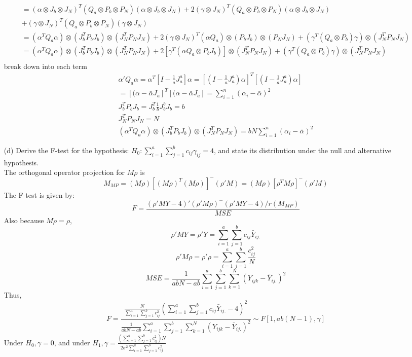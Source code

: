 \documentclass{homework}
\begin{document}
\begin{itemize}
\[\begin{split}
     = (\alpha \otimes J_b \otimes J_N)^T (Q_a \otimes P_b \otimes P_N) (\alpha \otimes J_b \otimes J_N) + 2(\gamma \otimes J_N)^T (Q_a \otimes P_b \otimes P_N) (\alpha \otimes J_b \otimes J_N) \\ +  (\gamma \otimes J_N)^T(Q_a \otimes P_b \otimes P_N)(\gamma \otimes J_N)\\
     = (\alpha^T Q_a \alpha) \otimes (J_b^T P_b J_b) \otimes (J_N^T P_N J_N) + 2(\gamma \otimes J_N)^T (\alpha Q_a) \otimes (P_bJ_b) \otimes (P_NJ_N) + (\gamma^T (Q_a \otimes P_b) \gamma) \otimes (J_N^T P_N J_N)\\
     = (\alpha^T Q_a \alpha) \otimes (J_b^T P_b J_b) \otimes (J_N^T P_N J_N) + 2[\gamma^T (\alpha Q_a \otimes P_bJ_b)] \otimes (J_N^T P_NJ_N) + (\gamma^T (Q_a \otimes P_b) \gamma) \otimes (J_N^T P_N J_N)\\ 
    \end{split}
    \]
    break down into each term
    \[ 
    \begin{split}
     \alpha'Q_a\alpha = \alpha^T [I- \frac{1}{a}J_a^a] \alpha  = [(I-\frac{1}{a}J_a^a)\alpha]^T[(I-\frac{1}{a}J_a^a)\alpha] \\
     = [(\alpha -\bar \alpha J_a]^T[(\alpha -\bar \alpha J_a] = \sum_{i=1}^{n} (\alpha_i - \bar \alpha)^2\\
     J_b^T P_b J_b = J_b^T \frac{1}{b} J_b^b J_b = b\\
     J_N^T P_N J_N = N\\
     (\alpha^T Q_a \alpha) \otimes (J_b^T P_b J_b) \otimes (J_N^T P_N J_N) =bN \sum_{i=1}^{n} (\alpha_i - \bar \alpha)^2
    \end{split}
    \] 
    
    \item[(d)] Derive the F-test for the hypothesis: $H_0: \sum_{i=1}^{a}\sum_{j=1}^{b} c_{ij}\gamma_{ij} =4$, and state its distribution under the null and alternative hypothesis.\\
    The orthogonal operator projection for $M\rho$ is\\
    \[ 
    M_{MP} = (M\rho) [(M\rho)^T (M\rho)]^{-} (\rho'M) = (M\rho) [\rho^T M\rho]^{-} (\rho'M)
    \]
     The F-test is given by:\\
    \[ 
    F = \frac{(\rho'MY - 4)' (\rho'M\rho)^{-} (\rho'MY -4)/ r(M_{MP})}{MSE}
    \] 
    Also because $M\rho = \rho$,
    \[ 
    \rho'MY = \rho'Y = \sum_{i=1}^{a}\sum_{j=1}^{b} c_{ij}\bar{Y}_{ij.}
    \] 
    \[ 
    \rho'M\rho = \rho'\rho =  \sum_{i=1}^{a}\sum_{j=1}^{b} \frac{c_{ij}^2}{N}
    \]
    \[ 
    MSE = \frac{1}{abN - ab} \sum_{i=1}^{a}\sum_{j=1}^{b}\sum_{k=1}^N (Y_{ijk} - \bar{Y}_{ij.})^2
    \]
    Thus,
    \[ 
    F =\frac{\frac{N}{\sum_{i=1}^{a}\sum_{j=1}^{b} c_{ij}^2} (\sum_{i=1}^{a}\sum_{j=1}^{b} c_{ij}\bar{Y}_{ij.} - 4)^2} {\frac{1}{abN - ab} \sum_{i=1}^{a}\sum_{j=1}^{b}\sum_{k=1}^N (Y_{ijk} - \bar{Y}_{ij.})^2} \sim F[1, ab(N-1), \gamma]
    \] 
    Under $H_0, \gamma = 0$, and under $H_1, \gamma = \frac{(\sum_{i=1}^{a}\sum_{j=1}^{b}c_{ij}^2)N}{2\sigma^2 \sum_{i=1}^{a}\sum_{j=1}^{b} c_{ij}^2 }$ 
    

\end{itemize}
\end{document}
